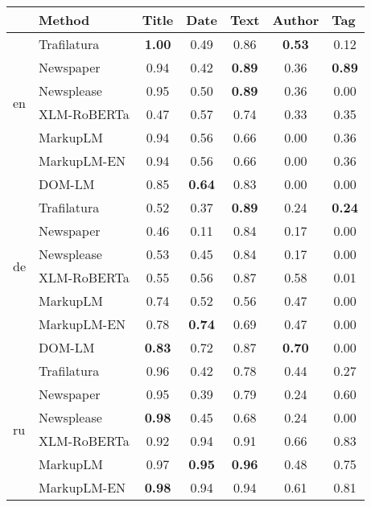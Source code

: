\begin{tabular}{|l|l|ccccc|}
\hline
 & Method & \multicolumn{1}{l}{Title} & \multicolumn{1}{l}{Date} & \multicolumn{1}{l}{Text} & \multicolumn{1}{l}{Author} & \multicolumn{1}{l|}{Tag} \\
\hline
\multirow{6}{*}{en} & Trafilatura & \textbf{1.00} & 0.49 & 0.86 & \textbf{0.53} & 0.12 \\
                    & Newspaper  & 0.94 & 0.42 & \textbf{0.89} & 0.36 & \textbf{0.89} \\
                    & Newsplease   & 0.95 & 0.50 & \textbf{0.89} & 0.36 & 0.00 \\
                    & XLM-RoBERTa & 0.47 & 0.57 & 0.74 & 0.33 & 0.35 \\
                    & MarkupLM    & 0.94 & 0.56 & 0.66 & 0.00 & 0.36 \\
                    & MarkupLM-EN & 0.94 & 0.56 & 0.66 & 0.00 & 0.36 \\
                    & DOM-LM      & 0.85 & \textbf{0.64} & 0.83 & 0.00 & 0.00 \\ \hline
\multirow{6}{*}{de} & Trafilatura & 0.52 & 0.37 & \textbf{0.89} & 0.24 & \textbf{0.24} \\
                    & Newspaper  & 0.46 & 0.11 & 0.84 & 0.17 & 0.00 \\
                    & Newsplease   & 0.53 & 0.45 & 0.84 & 0.17 & 0.00 \\
                    & XLM-RoBERTa & 0.55 & 0.56 & 0.87 & 0.58 & 0.01 \\
                    & MarkupLM    & 0.74 & 0.52 & 0.56 & 0.47 & 0.00  \\
                    & MarkupLM-EN & 0.78 & \textbf{0.74} & 0.69 & 0.47 & 0.00  \\
                    & DOM-LM      & \textbf{0.83} & 0.72 & 0.87 & \textbf{0.70} & 0.00  \\ \hline
\multirow{6}{*}{ru} & Trafilatura & 0.96 & 0.42 & 0.78 & 0.44 & 0.27  \\
                    & Newspaper  & 0.95 & 0.39 & 0.79 & 0.24 & 0.60  \\
                    & Newsplease   & \textbf{0.98} & 0.45 & 0.68 & 0.24 & 0.00  \\
                    & XLM-RoBERTa & 0.92 & 0.94 & 0.91 & 0.66 & 0.83 \\
                    & MarkupLM    & 0.97 & \textbf{0.95} & \textbf{0.96} & 0.48 & 0.75  \\
                    & MarkupLM-EN & \textbf{0.98} & 0.94 & 0.94 & 0.61 & 0.81  \\

\end{tabular}
